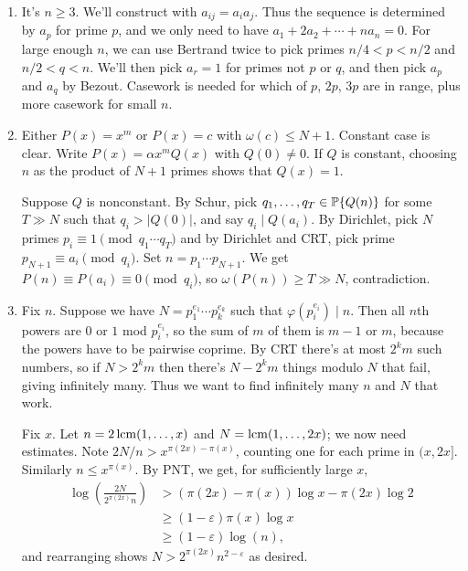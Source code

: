 \documentclass[11pt,paper=letter]{scrartcl}
\newcommand{\seq}[1]{\left\{#1\right\}}
\newcommand{\primeseq}[1]{\PP\!\seq{#1}}
\begin{document}
\begin{enumerate}
\item It's $n \ge 3$. We'll construct with $a_{ij} = a_ia_j$. Thus the sequence is determined by $a_p$ for prime $p$, and we only need to have $a_1 + 2a_2 + \cdots + na_n = 0$. For large enough $n$, we can use Bertrand twice to pick primes $n/4 < p < n/2$ and $n/2 < q < n$. We'll then pick $a_r = 1$ for primes not $p$ or $q$, and then pick $a_p$ and $a_q$ by Bezout. Casework is needed for which of $p$, $2p$, $3p$ are in range, plus more casework for small $n$.

\item Either $P(x) = x^m$ or $P(x) = c$ with $\omega(c) \le N + 1$. Constant case is clear. Write $P(x) = \alpha x^m Q(x)$ with $Q(0) \ne 0$. If $Q$ is constant, choosing $n$ as the product of $N+1$ primes shows that $Q(x) = 1$.

Suppose $Q$ is nonconstant. By Schur, pick $q_1, \ldots, q_T \in \primeseq{Q(n)}$ for some $T \gg N$ such that $q_i > |Q(0)|$, and say $q_i \mid Q(a_i)$. By Dirichlet, pick $N$ primes $p_i \equiv 1 \pmod{q_1 \cdots q_T}$ and by Dirichlet and CRT, pick prime $p_{N + 1} \equiv a_i \pmod{q_i}$. Set $n = p_1 \cdots p_{N + 1}$. We get $P(n) \equiv P(a_i) \equiv 0 \pmod{q_i}$, so $\omega(P(n)) \ge T \gg N$, contradiction.

\item Fix $n$. Suppose we have $N = p_1^{e_1} \cdots p_k^{e_k}$ such that $\varphi\left(p_i^{e_i}\right) \mid n$. Then all $n$th powers are $0$ or $1$ mod $p_i^{e_i}$, so the sum of $m$ of them is $m - 1$ or $m$, because the powers have to be pairwise coprime. By CRT there's at most $2^km$ such numbers, so if $N > 2^km$ then there's $N - 2^km$ things modulo $N$ that fail, giving infinitely many. Thus we want to find infinitely many $n$ and $N$ that work.

Fix $x$. Let $n = 2\operatorname*{lcm}(1, \ldots, x)$ and $N = \operatorname*{lcm}(1, \ldots, 2x)$; we now need estimates. Note $2N/n > x^{\pi(2x) - \pi(x)}$, counting one for each prime in $(x, 2x]$. Similarly $n \le x^{\pi(x)}$. By PNT, we get, for sufficiently large $x$,
\begin{align*}
  \log\left(\frac{2N}{2^{\pi(2x)}n}\right)
  &> (\pi(2x) - \pi(x))\log x  - \pi(2x)\log 2 \\
  &\ge (1 - \varepsilon)\pi(x)\log x \\
  &\ge (1 - \varepsilon)\log(n),
\end{align*}
and rearranging shows $N > 2^{\pi(2x)}n^{2 - \varepsilon}$ as desired.

\end{enumerate}
\end{document}
